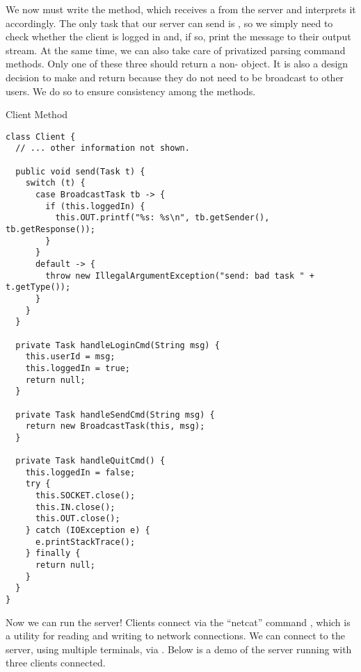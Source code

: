 We now must write the   method, which receives a  from the server and interprets it accordingly. The only task that our server can send is , so we simply need to check whether the client is logged in and, if so, print the message to their output stream. At the same time, we can also take care of privatized parsing command methods. Only one of these three should return a non- object. It is also a design decision to make  and  return  because they do not need to be broadcast to other users. We do so to ensure consistency among the methods.

\begin{cl}{Client  Method}
\begin{lstlisting}[language=MyJava]
class Client {
  // ... other information not shown.

  public void send(Task t) {
    switch (t) {
      case BroadcastTask tb -> {
        if (this.loggedIn) { 
          this.OUT.printf("%s: %s\n", tb.getSender(), tb.getResponse()); 
        }
      }
      default -> {
        throw new IllegalArgumentException("send: bad task " + t.getType());
      }
    }
  }

  private Task handleLoginCmd(String msg) {
    this.userId = msg;
    this.loggedIn = true;
    return null;
  }

  private Task handleSendCmd(String msg) {
    return new BroadcastTask(this, msg);
  }

  private Task handleQuitCmd() {
    this.loggedIn = false;
    try {
      this.SOCKET.close();
      this.IN.close();
      this.OUT.close();
    } catch (IOException e) { 
      e.printStackTrace(); 
    } finally {
      return null;
    }
  }
}
\end{lstlisting}
\end{cl}

Now we can run the server! Clients connect via the ``netcat'' command , which is a utility for reading and writing to network connections. We can connect to the server, using multiple terminals, via . Below is a demo of the server running with three clients connected.